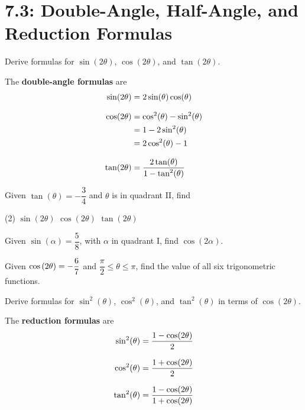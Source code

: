 \documentclass[../mathNotesPreamble]{subfiles}
\providecommand{\relscalefact}{1.4}
\begin{document}
\relscale{\relscalefact}
  \section{7.3: Double-Angle, Half-Angle, and Reduction Formulas}
  \begin{ex*}
    Derive formulas for $\sin(2\theta)$, $\cos(2\theta)$, and $\tan(2\theta)$.
  \end{ex*}
  \begin{defn*}
    The \textbf{double-angle formulas} are
    \begin{align*}
      \sin(2\theta)&=2\sin(\theta)\cos(\theta)\\[0.5\baselineskip]
      \cos(2\theta)&=\cos^2(\theta)-\sin^2(\theta)\\
        &=1-2\sin^2(\theta)\\
        &=2\cos^2(\theta)-1\\[0.5\baselineskip]
      \tan(2\theta)&=\dfrac{2\tan(\theta)}{1-\tan^2(\theta)}
    \end{align*}
  \end{defn*}
  \pagebreak

  \begin{ex*}
    Given $\tan(\theta)=-\dfrac{3}{4}$ and $\theta$ is in quadrant II, find
    \begin{extasks}[after-item-skip=\stretch{1}](2)
      \task* $\sin(2\theta)$
      \task $\cos(2\theta)$
      \task $\tan(2\theta)$
    \end{extasks}
  \end{ex*}
  \begin{ex*}
    Given $\sin(\alpha)=\dfrac{5}{8}$, with $\alpha$ in quadrant I, find $\cos(2\alpha)$.
  \end{ex*}
  \pagebreak

  \begin{ex*}
    Given $\cos{\left(2\theta\right)}=-\dfrac{6}{7}$ and $\dfrac{\pi}{2}\leq \theta\leq \pi$, find the value of all six trigonometric functions.
  \end{ex*}
  \pagebreak

  \begin{ex*}
    Derive formulas for $\sin^2(\theta)$, $\cos^2(\theta)$, and $\tan^2(\theta)$ in terms of $\cos(2\theta)$.
  \end{ex*}
  \begin{defn*}
    The \textbf{reduction formulas} are
    \begin{align*}
      \sin^2(\theta)&=\dfrac{1-\cos(2\theta)}{2}\\[0.5\baselineskip]
      \cos^2(\theta)&=\dfrac{1+\cos(2\theta)}{2}\\[0.5\baselineskip]
      \tan^2(\theta)&=\dfrac{1-\cos(2\theta)}{1+\cos(2\theta)}
    \end{align*}
  \end{defn*}
  \pagebreak
\end{document}

